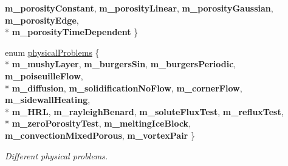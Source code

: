 \begin{DoxyCompactItemize}
{\bfseries m\-\_\-porosity\-Constant}, 
{\bfseries m\-\_\-porosity\-Linear}, 
{\bfseries m\-\_\-porosity\-Gaussian}, 
{\bfseries m\-\_\-porosity\-Edge}, 
\\*
{\bfseries m\-\_\-porosity\-Time\-Dependent}
 \}
\item 
enum \hyperlink{class_mushy_layer_params_a9681d6bd2a80ea8862f8e5442a403309}{physical\-Problems} \{ \\*
{\bfseries m\-\_\-mushy\-Layer}, 
{\bfseries m\-\_\-burgers\-Sin}, 
{\bfseries m\-\_\-burgers\-Periodic}, 
{\bfseries m\-\_\-poiseuille\-Flow}, 
\\*
{\bfseries m\-\_\-diffusion}, 
{\bfseries m\-\_\-solidification\-No\-Flow}, 
{\bfseries m\-\_\-corner\-Flow}, 
{\bfseries m\-\_\-sidewall\-Heating}, 
\\*
{\bfseries m\-\_\-\-H\-R\-L}, 
{\bfseries m\-\_\-rayleigh\-Benard}, 
{\bfseries m\-\_\-solute\-Flux\-Test}, 
{\bfseries m\-\_\-reflux\-Test}, 
\\*
{\bfseries m\-\_\-zero\-Porosity\-Test}, 
{\bfseries m\-\_\-melting\-Ice\-Block}, 
{\bfseries m\-\_\-convection\-Mixed\-Porous}, 
{\bfseries m\-\_\-vortex\-Pair}
 \}
\begin{DoxyCompactList}\small\item\em Different physical problems. \end{DoxyCompactList}\end{DoxyCompactItemize}
